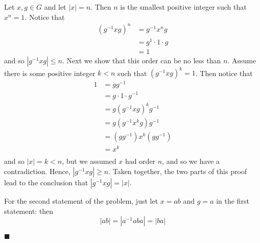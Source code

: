 \documentclass[12pt]{article}
\renewcommand{\qed}{\hfill$\blacksquare$}
\renewenvironment{proof}{\begin{addmargin}[1em]{0em}\begin{newproof}}{\end{newproof}\end{addmargin}\qed}
\begin{document}
\begin{proof}
Let $x,g\in G$ and let $\left|x\right| = n$. Then $n$ is the smallest positive integer such that $x^n=1$. Notice that
\begin{equation*}
    \begin{split}
        \left(g^{-1}xg\right)^n & = g^{-1}x^n g \\
        & = g^{1}\cdot 1 \cdot g \\
        & = 1
    \end{split}
\end{equation*}
and so $\left|g^{-1}xg\right|\leq n$. Next we show that this order can be no less than $n$. Assume there is some positive integer $k<n$ such that
$ \left(g^{-1}xg\right)^k=1$. Then notice that
\begin{equation*}
    \begin{split}
    1 & = gg^{-1} \\
    & = g\cdot 1 \cdot g^{-1} \\
    & = g \left(g^{-1}xg\right)^k g^{-1} \\
    & = g \left(g^{-1}x^k g\right) g^{-1} \\
    & = \left(g g^{-1}\right)x^k \left(g g^{-1}\right) \\
    & = x^k \\
    \end{split}
\end{equation*}
and so $\left|x\right|=k<n$, but we assumed $x$ had order $n$, and so we have a contradiction. Hence, $\left|g^{-1}xg\right|\geq n$. Taken together, the two parts of this proof lead to the conclusion that $\left|g^{-1}xg\right|=\left|x\right|$.

For the second statement of the problem, just let $x=ab$ and $g=a$ in the first statement: then
$$ \left|ab\right| = \left|a^{-1}aba\right| = \left|ba\right| $$
\end{proof}
\end{document}
